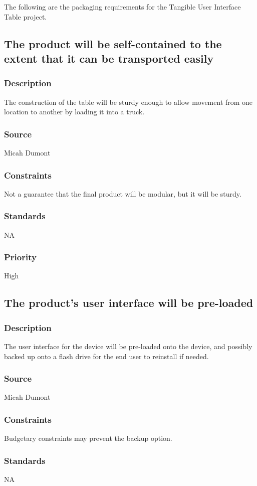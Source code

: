 The following are the packaging requirements for the Tangible User Interface Table project.

\subsection{The product will be self-contained to the extent that it can be transported easily}
\subsubsection{Description}
The construction of the table will be sturdy enough to allow movement from one location to another by loading it into a truck.
\subsubsection{Source}
Micah Dumont
\subsubsection{Constraints}
Not a guarantee that the final product will be modular, but it will be sturdy.
\subsubsection{Standards}
NA
\subsubsection{Priority}
High

\subsection{The product's user interface will be pre-loaded}
\subsubsection{Description}
The user interface for the device will be pre-loaded onto the device, and possibly backed up onto a flash drive for the end user to reinstall if needed.
\subsubsection{Source}
Micah Dumont
\subsubsection{Constraints}
Budgetary constraints may prevent the backup option.
\subsubsection{Standards}
NA
